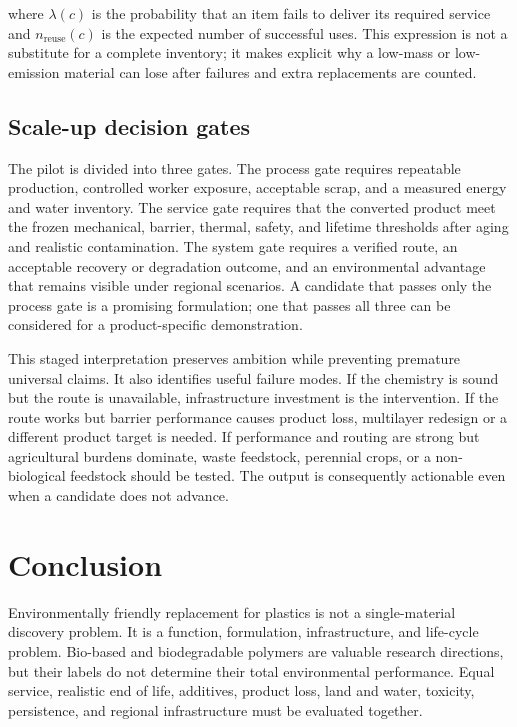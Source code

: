 \documentclass[conference]{IEEEtran}
\begin{document}
where $\lambda(c)$ is the probability that an item fails to deliver its required service and $n_{\mathrm{reuse}}(c)$ is the expected number of successful uses. This expression is not a substitute for a complete inventory; it makes explicit why a low-mass or low-emission material can lose after failures and extra replacements are counted.

\subsection{Scale-up decision gates}

The pilot is divided into three gates. The process gate requires repeatable production, controlled worker exposure, acceptable scrap, and a measured energy and water inventory. The service gate requires that the converted product meet the frozen mechanical, barrier, thermal, safety, and lifetime thresholds after aging and realistic contamination. The system gate requires a verified route, an acceptable recovery or degradation outcome, and an environmental advantage that remains visible under regional scenarios. A candidate that passes only the process gate is a promising formulation; one that passes all three can be considered for a product-specific demonstration.

This staged interpretation preserves ambition while preventing premature universal claims. It also identifies useful failure modes. If the chemistry is sound but the route is unavailable, infrastructure investment is the intervention. If the route works but barrier performance causes product loss, multilayer redesign or a different product target is needed. If performance and routing are strong but agricultural burdens dominate, waste feedstock, perennial crops, or a non-biological feedstock should be tested. The output is consequently actionable even when a candidate does not advance.

\section{Conclusion}

Environmentally friendly replacement for plastics is not a single-material discovery problem. It is a function, formulation, infrastructure, and life-cycle problem. Bio-based and biodegradable polymers are valuable research directions, but their labels do not determine their total environmental performance. Equal service, realistic end of life, additives, product loss, land and water, toxicity, persistence, and regional infrastructure must be evaluated together.
\end{document}
